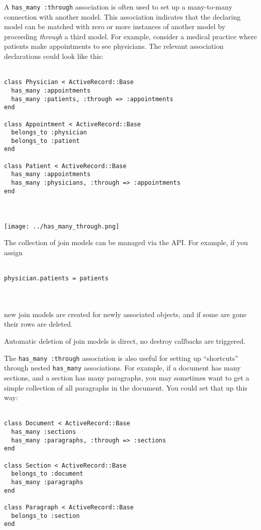 \documentclass[10pt]{book}
\begin{document}
A \texttt{has\_many :through} association is often used to set up a  many-to-many connection with another model. This association indicates  that the declaring model can be matched with zero or more instances of  another model by proceeding \emph{through} a third model. For example,  consider a medical practice where patients make appointments to see  physicians. The relevant association declarations could look like this:
\\ \\
\begin{minipage}{\textwidth}{\scriptsize
\begin{verbatim}
class Physician < ActiveRecord::Base
  has_many :appointments
  has_many :patients, :through => :appointments
end
 
class Appointment < ActiveRecord::Base
  belongs_to :physician
  belongs_to :patient
end
 
class Patient < ActiveRecord::Base
  has_many :appointments
  has_many :physicians, :through => :appointments
end
\end{verbatim}}
\end{minipage}
\\ \\

\texttt{[image: ../has\_many\_through.png]}

The collection of join models can be managed via the API. For example, if you assign
\\ \\
\begin{minipage}{\textwidth}{\scriptsize
\begin{verbatim}
physician.patients = patients
\end{verbatim}}
\end{minipage}
\\ \\
new join models are created for newly associated objects, and if some are gone their rows are deleted.



Automatic deletion of join models is direct, no destroy callbacks are triggered.

The \texttt{has\_many :through} association is also useful for setting up “shortcuts” through nested \texttt{has\_many}  associations. For example, if a document has many sections, and a  section has many paragraphs, you may sometimes want to get a simple  collection of all paragraphs in the document. You could set that up this  way:
\\ \\
\begin{minipage}{\textwidth}{\scriptsize
\begin{verbatim}
class Document < ActiveRecord::Base
  has_many :sections
  has_many :paragraphs, :through => :sections
end
 
class Section < ActiveRecord::Base
  belongs_to :document
  has_many :paragraphs
end
 
class Paragraph < ActiveRecord::Base
  belongs_to :section
end
\end{verbatim}}
\end{minipage}
\\ \\
\end{document}
